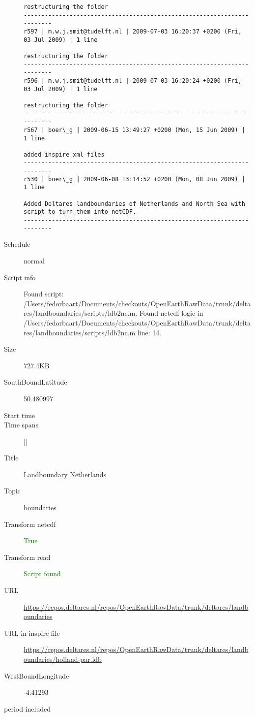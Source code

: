 \documentclass[9]{report}
\begin{document}
\begin{description}
\begin{verbatim}
restructuring the folder
------------------------------------------------------------------------
r597 | m.w.j.smit@tudelft.nl | 2009-07-03 16:20:37 +0200 (Fri, 03 Jul 2009) | 1 line

restructuring the folder
------------------------------------------------------------------------
r596 | m.w.j.smit@tudelft.nl | 2009-07-03 16:20:24 +0200 (Fri, 03 Jul 2009) | 1 line

restructuring the folder
------------------------------------------------------------------------
r567 | boer\_g | 2009-06-15 13:49:27 +0200 (Mon, 15 Jun 2009) | 1 line

added inspire xml files
------------------------------------------------------------------------
r530 | boer\_g | 2009-06-08 13:14:52 +0200 (Mon, 08 Jun 2009) | 1 line

Added Deltares landboundaries of Netherlands and North Sea with script to turn them into netCDF.
------------------------------------------------------------------------

\end{verbatim}
  \item[Schedule] normal
  \item[Script info] Found script: /Users/fedorbaart/Documents/checkouts/OpenEarthRawData/trunk/deltares/landboundaries/scripts/ldb2nc.m.
Found netcdf logic in /Users/fedorbaart/Documents/checkouts/OpenEarthRawData/trunk/deltares/landboundaries/scripts/ldb2nc.m line: 14.
  \item[Size] 727.4KB
  \item[SouthBoundLatitude] 50.480997
  \item[Start time] 
  \item[Time spans] []
  \item[Title]  Landboundary Netherlands 
  \item[Topic] boundaries
  \item[Transform netcdf] \textcolor{green}{True}
  \item[Transform read] \textcolor{green}{Script found}
  \item[URL] \href{https://repos.deltares.nl/repos/OpenEarthRawData/trunk/deltares/landboundaries}{https://repos.deltares.nl/repos/OpenEarthRawData/trunk/deltares/landboundaries}
  \item[URL in inspire file] \href{https://repos.deltares.nl/repos/OpenEarthRawData/trunk/deltares/landboundaries/holland-par.ldb}{https://repos.deltares.nl/repos/OpenEarthRawData/trunk/deltares/landboundaries/holland-par.ldb}
  \item[WestBoundLongitude] -4.41293
  \item[period included] 
\end{description}
\end{document}
